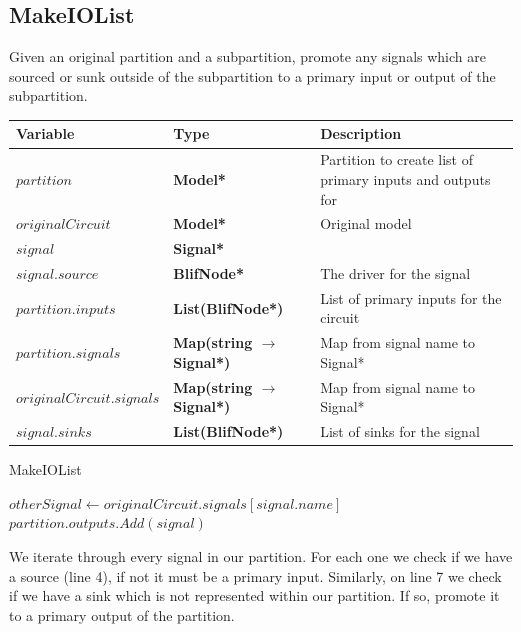 \documentclass[12pt,final,oneside]{dwThesis} %
\begin{document}
   \subsection{MakeIOList}
   Given an original partition and a subpartition, promote any signals which are sourced or sunk outside of the subpartition to a primary input or output of the subpartition.
   \begin{algorithm}
      \begin{center}
         \begin{tabularx}{\linewidth}{llX}
            \toprule
            Variable & Type & Description\\
            \midrule
            $partition$ &\textbf{  Model* } &  Partition to create list of primary inputs and outputs for\\
            $originalCircuit$ &\textbf{  Model* } &  Original model \\
            $signal$ &\textbf{  Signal* } &  \\
            $signal.source$ &\textbf{  BlifNode* } &  The driver for the signal \\
            $partition.inputs$ &\textbf{  List(BlifNode*) } &  List of primary inputs for the circuit \\
            $partition.signals$ &\textbf{  Map(string $\to$ Signal*) } &  Map from signal name to Signal* \\
            $originalCircuit.signals$ &\textbf{  Map(string $\to$ Signal*) } &  Map from signal name to Signal* \\
            $signal.sinks$ &\textbf{  List(BlifNode*) } &  List of sinks for the signal \\

            \bottomrule
         \end{tabularx}
      \end{center}
      \caption{MakeIOList}\label{makeiolist}
      \begin{algorithmic}[1]
          
         \EndIf
         \State $otherSignal \gets originalCircuit.signals[signal.name]$ 
          
         \State $partition.outputs.Add(signal)$
         \EndIf
         \EndFor
         \EndProcedure
      \end{algorithmic}
   \end{algorithm}
   We iterate through every signal in our partition. For each one we check if we have a source (line 4), if not it must be a primary input. Similarly, on line 7 we check if we have a sink which is not represented within our partition. If so, promote it to a primary output of the partition.
\end{document}
